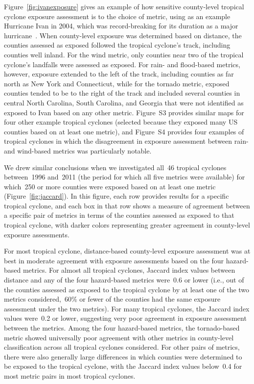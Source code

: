 Figure~\ref{fig:ivanexposure} gives an example of how sensitive county-level
tropical cyclone exposure assessment is to the choice of metric, using as an
example Hurricane Ivan in 2004, which was record-breaking for its
duration as a major hurricane~\citep{franklin2006atlantic}. When county-level
exposure was determined based on distance, the counties assessed as exposed
followed the tropical cyclone's track, including counties well inland. For the
wind metric, only counties near two of the tropical cyclone's landfalls were
assessed as exposed. For rain- and flood-based metrics, however, exposure
extended to the left of the track, including counties as far north as New York
and Connecticut, while for the tornado metric, exposed counties tended to be to
the right of the track and included several counties in central North Carolina,
South Carolina, and Georgia that were not identified as exposed to Ivan based
on any other metric.  Figure~S3 provides similar maps for four other example
tropical cyclones (selected because they exposed many \ac{US}  counties based on
at least one metric), and Figure~S4 provides four examples of tropical cyclones
in which the disagreement in exposure assessment between rain- and wind-based
metrics was particularly notable.

We drew similar conclusions when we investigated all~46 tropical cyclones
between~1996 and~2011 (the period for which all five metrics were available)
for which~250 or more counties were exposed based on at least one metric
(Figure~\ref{fig:jaccard}). In this figure, each row provides results for a
specific tropical cyclone, and each box in that row shows a measure of
agreement between a specific pair of metrics in terms of the counties assessed
as exposed to that tropical cyclone, with darker colors representing greater
agreement in county-level exposure assessments.  

For most tropical cyclone, distance-based county-level exposure assessment was
at best in moderate agreement with exposure assessments based on the four
hazard-based metrics. For almost all tropical cyclones, Jaccard index values
between distance and any of the four hazard-based metrics were~0.6 or lower
(i.e., out of the counties assessed as exposed to the tropical cyclone by at
least one of the two metrics considered,~60\si{\percent} or fewer of the
counties had the same exposure assessment under the two metrics). For many
tropical cyclones, the Jaccard index values were~0.2 or lower, suggesting very
poor agreement in exposure assessment between the metrics.  Among the four
hazard-based metrics, the tornado-based metric showed universally poor
agreement with other metrics in county-level classification across all tropical
cyclones considered.  For other pairs of metrics, there were also generally
large differences in which counties were determined to be exposed to the
tropical cyclone, with the Jaccard index values below~0.4 for most metric pairs
in most tropical cyclones.

